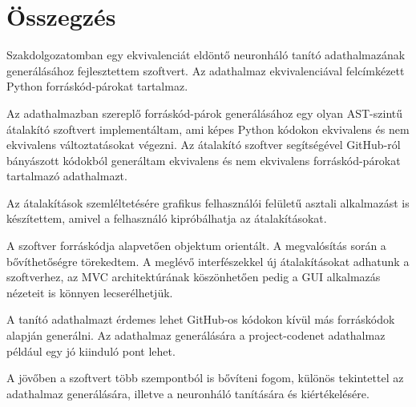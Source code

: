 \chapter{Összegzés}
\label{ch:sum}

Szakdolgozatomban egy ekvivalenciát eldöntő neuronháló tanító adathalmazának generálásához fejlesztettem szoftvert.
Az adathalmaz ekvivalenciával felcímkézett Python forráskód-párokat tartalmaz.

Az adathalmazban szereplő forráskód-párok generálásához egy olyan AST-szintű
átalakító szoftvert implementáltam,
ami képes Python kódokon ekvivalens és nem ekvivalens változtatásokat végezni.
Az átalakító szoftver segítségével GitHub-ról bányászott kódokból generáltam
ekvivalens és nem ekvivalens forráskód-párokat tartalmazó adathalmazt.

Az átalakítások szemléltetésére grafikus felhasználói felületű asztali alkalmazást is készítettem,
amivel a felhasználó kipróbálhatja az átalakításokat.

A szoftver forráskódja alapvetően objektum orientált.
A megvalósítás során a bővíthetőségre törekedtem.
A meglévő interfészekkel új átalakításokat adhatunk a szoftverhez, az MVC architektúrának köszönhetően pedig a GUI alkalmazás nézeteit is könnyen lecserélhetjük.

A tanító adathalmazt érdemes lehet GitHub-os kódokon kívül más forráskódok alapján generálni.
Az adathalmaz generálására a project-codenet \cite{puri2021codenet} adathalmaz például egy jó kiinduló pont lehet.

A jövőben a szoftvert több szempontból is bővíteni fogom, különös tekintettel
az adathalmaz generálására, illetve a neuronháló tanítására és kiértékelésére.
